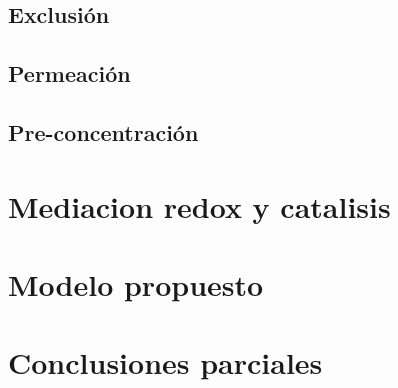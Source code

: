 	\subsection{Exclusión}

	\subsection{Permeación}

	\subsection{Pre-concentración}

\section{Mediacion redox y catalisis}

\section{Modelo propuesto}

\section{Conclusiones parciales}





	

